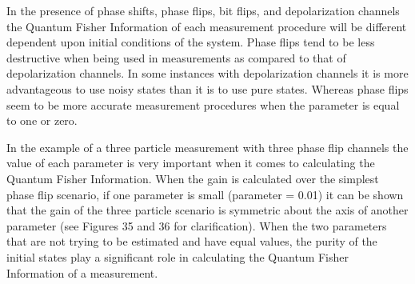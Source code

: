 \documentclass[twocolumn]{article}
\begin{document}
In the presence of phase shifts, phase flips, bit flips, and depolarization channels the Quantum Fisher Information of each measurement procedure will be different dependent upon initial conditions of the system. Phase flips tend to be less destructive when being used in measurements as compared to that of depolarization channels. In some instances with depolarization channels it is more advantageous to use noisy states than it is to use pure states. Whereas phase flips seem to be more accurate measurement procedures when the parameter is equal to one or zero.

In the example of a three particle measurement with three phase flip channels the value of each parameter is very important when it comes to calculating the Quantum Fisher Information. When the gain is calculated over the simplest phase flip scenario, if one parameter is small (parameter = 0.01) it can be shown that the gain of the three particle scenario is symmetric about the axis of another parameter (see Figures 35 and 36 for clarification). When the two parameters that are not trying to be estimated and have equal values, the purity of the initial states play a significant role in calculating the Quantum Fisher Information of a measurement.
\end{document}
